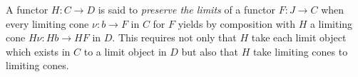 A functor $H : C \rightarrow D$ is said to \textit{preserve the limits} of a functor $F : J \rightarrow C$ when every limiting cone $\nu : b \rightarrow F$ in $C$ for $F$ yields by composition with $H$ a limiting cone $H\nu : Hb \rightarrow HF$ in $D$. This requires not only that $H$ take each limit object which exists in $C$ to a limit object in $D$ but also that $H$ take limiting cones to limiting cones.
